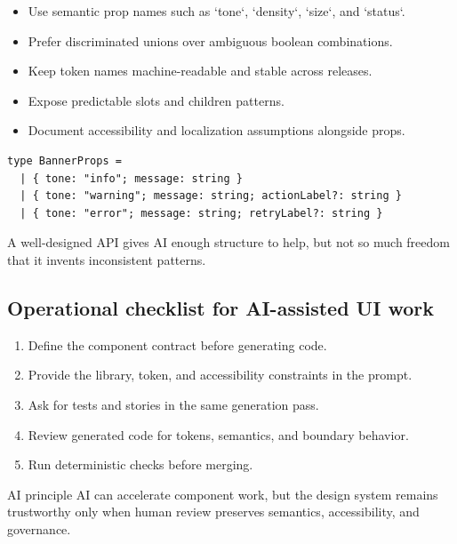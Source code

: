 \begin{itemize}[leftmargin=*, itemsep=0.35em]
  \item Use semantic prop names such as `tone`, `density`, `size`, and `status`.
  \item Prefer discriminated unions over ambiguous boolean combinations.
  \item Keep token names machine-readable and stable across releases.
  \item Expose predictable slots and children patterns.
  \item Document accessibility and localization assumptions alongside props.
\end{itemize}

\begin{verbatim}
type BannerProps =
  | { tone: "info"; message: string }
  | { tone: "warning"; message: string; actionLabel?: string }
  | { tone: "error"; message: string; retryLabel?: string }
\end{verbatim}

A well-designed API gives AI enough structure to help, but not so much freedom that it invents inconsistent patterns.

\subsection{Operational checklist for AI-assisted UI work}
\begin{enumerate}[leftmargin=*, itemsep=0.35em]
  \item Define the component contract before generating code.
  \item Provide the library, token, and accessibility constraints in the prompt.
  \item Ask for tests and stories in the same generation pass.
  \item Review generated code for tokens, semantics, and boundary behavior.
  \item Run deterministic checks before merging.
\end{enumerate}

\begin{highlightbox}{AI principle}
AI can accelerate component work, but the design system remains trustworthy only when human review preserves semantics, accessibility, and governance.
\end{highlightbox}
